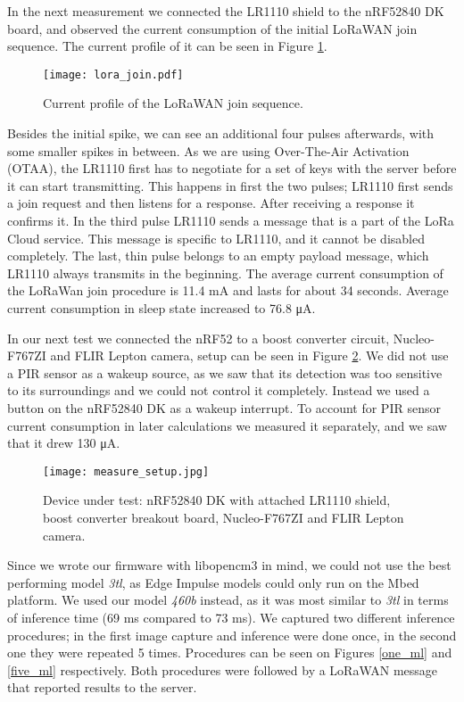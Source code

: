 In the next measurement we connected the LR1110 shield to the nRF52840 DK board, and observed the current consumption of the initial LoRaWAN join sequence.
The current profile of it can be seen in Figure \ref{lora_join}.
\newline
\begin{figure}[ht]
    \centering
    \texttt{[image: lora\_join.pdf]}
    \caption{ Current profile of the LoRaWAN join sequence.}
    \label{lora_join}
\end{figure}

Besides the initial spike, we can see an additional four pulses afterwards, with some smaller spikes in between. 
As we are using Over-The-Air Activation (OTAA), the LR1110 first has to negotiate for a set of keys with the server before it can start transmitting.
This happens in first the two pulses; LR1110 first sends a join request and then listens for a response.
After receiving a response it confirms it.
In the third pulse LR1110 sends a message that is a part of the LoRa Cloud service.
This message is specific to LR1110, and it cannot be disabled completely.
The last, thin pulse belongs to an empty payload message, which LR1110 always transmits in the beginning.
The average current consumption of the LoRaWan join procedure is 11.4 \si{\milli\ampere} and lasts for about 34 seconds.
Average current consumption in sleep state increased to 76.8 \si{\micro\ampere}.

In our next test we connected the nRF52 to a boost converter circuit, Nucleo-F767ZI and FLIR Lepton camera, setup can be seen in Figure \ref{measure_setup}.
We did not use a PIR sensor as a wakeup source, as we saw that its detection was too sensitive to its surroundings and we could not control it completely.
Instead we used a button on the nRF52840 DK as a wakeup interrupt.
To account for PIR sensor current consumption in later calculations we measured it separately, and we saw that it drew 130 \si{\micro\ampere}.
\begin{figure}[ht]
    \centering
    \texttt{[image: measure\_setup.jpg]}
    \caption{ Device under test: nRF52840 DK with attached LR1110 shield, boost converter breakout board, Nucleo-F767ZI and FLIR Lepton camera.}
    \label{measure_setup}
\end{figure}

Since we wrote our firmware with libopencm3 in mind, we could not use the best performing model \textit{3tl}, as Edge Impulse models could only run on the Mbed platform.
We used our model \textit{460b} instead, as it was most similar to \textit{3tl} in terms of inference time (69 \si{\milli\second} compared to 73 \si{\milli\second}).
We captured two different inference procedures; in the first image capture and inference were done once, in the second one they were repeated 5 times.
Procedures can be seen on Figures \ref{one_ml} and \ref{five_ml} respectively.
Both procedures were followed by a LoRaWAN message that reported results to the server.

